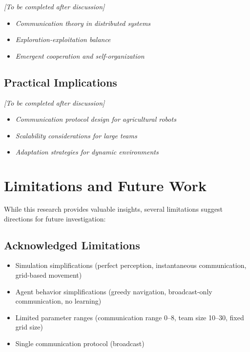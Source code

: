 \textit{[To be completed after discussion]}

\begin{itemize}
    \item \textit{Communication theory in distributed systems}
    \item \textit{Exploration-exploitation balance}
    \item \textit{Emergent cooperation and self-organization}
\end{itemize}

\subsection{Practical Implications}

\textit{[To be completed after discussion]}

\begin{itemize}
    \item \textit{Communication protocol design for agricultural robots}
    \item \textit{Scalability considerations for large teams}
    \item \textit{Adaptation strategies for dynamic environments}
\end{itemize}

\section{Limitations and Future Work}

While this research provides valuable insights, several limitations suggest directions for future investigation:

\subsection{Acknowledged Limitations}

\begin{itemize}
    \item Simulation simplifications (perfect perception, instantaneous communication, grid-based movement)
    \item Agent behavior simplifications (greedy navigation, broadcast-only communication, no learning)
    \item Limited parameter ranges (communication range 0--8, team size 10--30, fixed grid size)
    \item Single communication protocol (broadcast)
\end{itemize}

